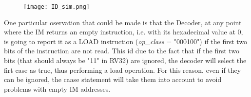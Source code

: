 \begin{figure}[h!]
  \centering
  \texttt{[image: ID\_sim.png]}
\end{figure}

One particular oservation that could be made is that the Decoder, at any point where the IM returns an empty instruction, i.e. with its hexadecimal value at 0, is going to report it as a LOAD instruction (\emph{op{\_}class} = "000100") if the first two bits of the instruction are not read. This id due to the fact that if the first two bits (that should always be "11" in RV32) are ignored, the decoder will select the firt case as true, thus performing a load operation. For this reason, even if they can be ignored, the caase statement will take them into account to avoid problems with empty IM addresses.